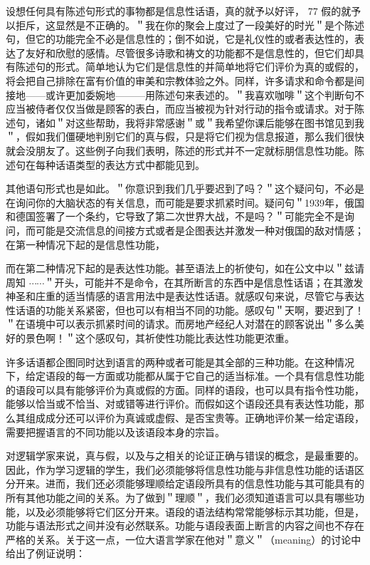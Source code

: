 设想任何具有陈述句形式的事物都是信息性话语，真的就予以好评， 77 假的就予以拒斥，这显然是不正确的。＂我在你的聚会上度过了一段美好的时光＂是个陈述句，但它的功能完全不必是信息性的；倒不如说，它是礼仪性的或者表达性的，表达了友好和欣慰的感情。尽管很多诗歌和祷文的功能都不是信息性的，但它们却具有陈述句的形式。简单地认为它们是信息性的并简单地将它们评价为真的或假的，将会把自己排除在富有价值的审美和宗教体验之外。同样，许多请求和命令都是间接地——或许更加委婉地———用陈述句来表述的。＂我喜欢咖啡＂这个判断句不应当被侍者仅仅当做是顾客的表白，而应当被视为针对行动的指令或请求。对于陈述句，诸如＂对这些帮助，我将非常感谢＂或＂我希望你课后能够在图书馆见到我＂，假如我们僵硬地判别它们的真与假，只是将它们视为信息报道，那么我们很快就会没朋友了。这些例子向我们表明，陈述的形式并不一定就标朋信息性功能。陈述句在每种话语类型的表达方式中都能见到。

其他语句形式也是如此。＂你意识到我们几乎要迟到了吗？＂这个疑问句，不必是在询问你的大脑状态的有关信息，而可能是要求抓紧时间。疑问句＂1939年，俄国和德国签署了一个条约，它导致了第二次世界大战，不是吗？＂可能完全不是询问，而可能是交流信息的间接方式或者是企图表达并激发一种对俄国的敌对情感；在第一种情况下起的是信息性功能，

而在第二种情况下起的是表达性功能。甚至语法上的祈使句，如在公文中以＂兹请周知 $\cdots \cdots$＂开头，可能并不是命令，在其所断言的东西中是信息性话语；在其激发神圣和庄重的适当情感的语言用法中是表达性话语。就感叹句来说，尽管它与表达性话语的功能关系紧密，但也可以有相当不同的功能。感叹句＂天啊，要迟到了！＂在语境中可以表示抓紧时间的请求。而房地产经纪人对潜在的顾客说出＂多么美好的景色啊！＂这个感叹句，其祈使性功能比表达性功能更浓重。

许多话语都企图同时达到语言的两种或者可能是其全部的三种功能。在这种情况下，给定语段的每一方面或功能都从属于它自己的适当标准。一个具有信息性功能的语段可以具有能够评价为真或假的方面。同样的语段，也可以具有指令性功能，能够以恰当或不恰当、对或错等进行评价。而假如这个语段还具有表达性功能，那么其组成成分还可以评价为真诚或虚假、是否宝贵等。正确地评价某一给定语段，需要把握语言的不同功能以及该语段本身的宗旨。

对逻辑学家来说，真与假，以及与之相关的论证正确与错误的概念，是最重要的。因此，作为学习逻辑的学生，我们必须能够将信息性功能与非信息性功能的话语区分开来。进而，我们还必须能够理顺给定语段所具有的信息性功能与其可能具有的所有其他功能之间的关系。为了做到＂理顺＂，我们必须知道语言可以具有哪些功能，以及必须能够将它们区分开来。语段的语法结构常常能够标示其功能，但是，功能与语法形式之间并没有必然联系。功能与语段表面上断言的内容之间也不存在严格的关系。关于这一点，一位大语言学家在他对＂意义＂（meaning）的讨论中给出了例证说明：

